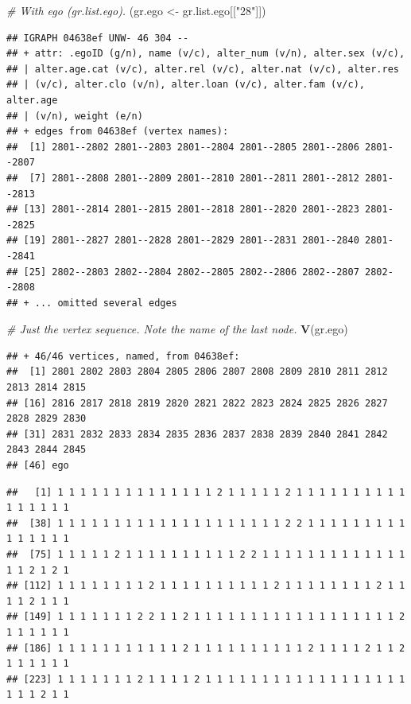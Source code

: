 \documentclass[
]{book}
\newenvironment{Shaded}{\begin{snugshade}}{\end{snugshade}}
\newcommand{\CommentTok}[1]{\textcolor[rgb]{0.56,0.35,0.01}{\textit{#1}}}
\newcommand{\FunctionTok}[1]{\textcolor[rgb]{0.13,0.29,0.53}{\textbf{#1}}}
\newcommand{\NormalTok}[1]{#1}
\newcommand{\OtherTok}[1]{\textcolor[rgb]{0.56,0.35,0.01}{#1}}
\newcommand{\SpecialCharTok}[1]{\textcolor[rgb]{0.81,0.36,0.00}{\textbf{#1}}}
\newcommand{\StringTok}[1]{\textcolor[rgb]{0.31,0.60,0.02}{#1}}
\begin{document}
\begin{Shaded}
\begin{Highlighting}[]
\CommentTok{\# With ego (gr.list.ego). }
\NormalTok{(gr.ego }\OtherTok{\textless{}{-}}\NormalTok{ gr.list.ego[[}\StringTok{"28"}\NormalTok{]])}
\end{Highlighting}
\end{Shaded}

\begin{verbatim}
## IGRAPH 04638ef UNW- 46 304 -- 
## + attr: .egoID (g/n), name (v/c), alter_num (v/n), alter.sex (v/c),
## | alter.age.cat (v/c), alter.rel (v/c), alter.nat (v/c), alter.res
## | (v/c), alter.clo (v/n), alter.loan (v/c), alter.fam (v/c), alter.age
## | (v/n), weight (e/n)
## + edges from 04638ef (vertex names):
##  [1] 2801--2802 2801--2803 2801--2804 2801--2805 2801--2806 2801--2807
##  [7] 2801--2808 2801--2809 2801--2810 2801--2811 2801--2812 2801--2813
## [13] 2801--2814 2801--2815 2801--2818 2801--2820 2801--2823 2801--2825
## [19] 2801--2827 2801--2828 2801--2829 2801--2831 2801--2840 2801--2841
## [25] 2802--2803 2802--2804 2802--2805 2802--2806 2802--2807 2802--2808
## + ... omitted several edges
\end{verbatim}

\begin{Shaded}
\begin{Highlighting}[]
\CommentTok{\# Just the vertex sequence. Note the name of the last node.}
\FunctionTok{V}\NormalTok{(gr.ego)}
\end{Highlighting}
\end{Shaded}

\begin{verbatim}
## + 46/46 vertices, named, from 04638ef:
##  [1] 2801 2802 2803 2804 2805 2806 2807 2808 2809 2810 2811 2812 2813 2814 2815
## [16] 2816 2817 2818 2819 2820 2821 2822 2823 2824 2825 2826 2827 2828 2829 2830
## [31] 2831 2832 2833 2834 2835 2836 2837 2838 2839 2840 2841 2842 2843 2844 2845
## [46] ego
\end{verbatim}

\begin{Shaded}
\end{Shaded}

\begin{verbatim}
##   [1] 1 1 1 1 1 1 1 1 1 1 1 1 1 1 2 1 1 1 1 1 2 1 1 1 1 1 1 1 1 1 1 1 1 1 1 1 1
##  [38] 1 1 1 1 1 1 1 1 1 1 1 1 1 1 1 1 1 1 1 1 2 2 1 1 1 1 1 1 1 1 1 1 1 1 1 1 1
##  [75] 1 1 1 1 1 2 1 1 1 1 1 1 1 1 1 1 2 2 1 1 1 1 1 1 1 1 1 1 1 1 1 1 1 2 1 2 1
## [112] 1 1 1 1 1 1 1 1 2 1 1 1 1 1 1 1 1 1 1 2 1 1 1 1 1 1 1 1 2 1 1 1 1 2 1 1 1
## [149] 1 1 1 1 1 1 1 2 2 1 1 2 1 1 1 1 1 1 1 1 1 1 1 1 1 1 1 1 1 1 2 1 1 1 1 1 1
## [186] 1 1 1 1 1 1 1 1 1 1 1 2 1 1 1 1 1 1 1 1 1 1 2 1 1 1 1 2 1 1 2 1 1 1 1 1 1
## [223] 1 1 1 1 1 1 1 2 1 1 1 1 2 1 1 1 1 1 1 1 1 1 1 1 1 1 1 1 1 1 1 1 1 1 2 1 1
\end{verbatim}
\end{document}
